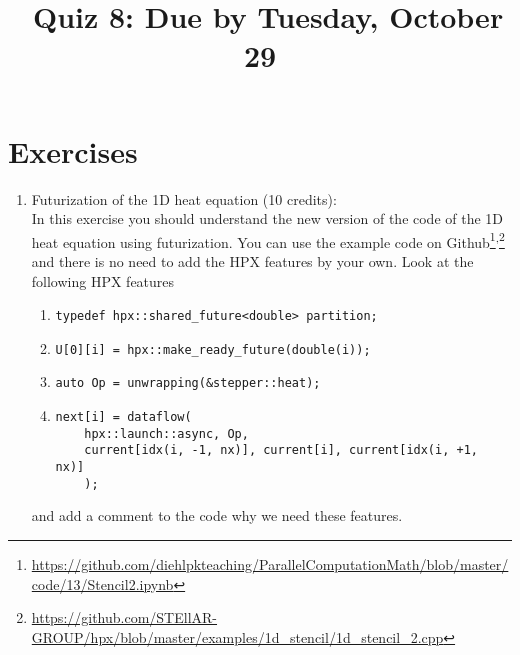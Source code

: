 \documentclass[11pt]{article}
\begin{document}
\title{\coursename~Quiz 8: Due by Tuesday, October 29}
\date{}
\maketitle

\medskip


\section*{Exercises}

\begin{enumerate}
\item Futurization of the 1D heat equation (10 credits): \\
In this exercise you should understand the new version of the code of the 1D heat equation using futurization. You can use the example code on Github\footnote{\url{https://github.com/diehlpkteaching/ParallelComputationMath/blob/master/code/13/Stencil2.ipynb}}\textsuperscript{,}\footnote{\url{https://github.com/STEllAR-GROUP/hpx/blob/master/examples/1d_stencil/1d_stencil_2.cpp}} and there is no need to add the HPX features by your own. Look at the following HPX features
\begin{enumerate}
\item \lstinline|typedef hpx::shared_future<double> partition;|
\item \lstinline|U[0][i] = hpx::make_ready_future(double(i));|
\item \lstinline|auto Op = unwrapping(&stepper::heat);|
\item \begin{lstlisting}
next[i] = dataflow(
	hpx::launch::async, Op,
	current[idx(i, -1, nx)], current[i], current[idx(i, +1, nx)]
	);
\end{lstlisting}
\end{enumerate}
and add a comment to the code why we need these features.


\end{enumerate}
\doclicenseThis 
\end{document}
